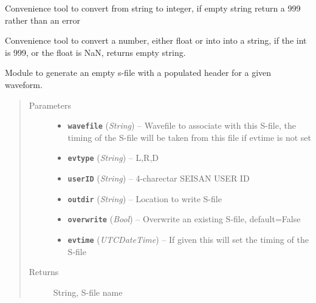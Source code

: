\documentclass[a4paper,10pt,english]{sphinxmanual}
\begin{document}
\begin{fulllineitems}
\label{submodules/utils.Sfile_util:Sfile_util._int_conv}
Convenience tool to convert from string to integer, if empty string return
a 999 rather than an error

\end{fulllineitems}


\begin{fulllineitems}
\label{submodules/utils.Sfile_util:Sfile_util._str_conv}
Convenience tool to convert a number, either float or into into a string,
if the int is 999, or the float is NaN, returns empty string.

\end{fulllineitems}


\begin{fulllineitems}
\label{submodules/utils.Sfile_util:Sfile_util.blanksfile}
Module to generate an empty s-file with a populated header for a given
waveform.
\begin{quote}\begin{description}
\item[{Parameters}] \leavevmode\begin{itemize}
\item {} 
\textbf{\texttt{wavefile}} (\emph{String}) -- Wavefile to associate with this S-file, the timing of the
S-file will be taken from this file if evtime is not set

\item {} 
\textbf{\texttt{evtype}} (\emph{String}) -- L,R,D

\item {} 
\textbf{\texttt{userID}} (\emph{String}) -- 4-charectar SEISAN USER ID

\item {} 
\textbf{\texttt{outdir}} (\emph{String}) -- Location to write S-file

\item {} 
\textbf{\texttt{overwrite}} (\emph{Bool}) -- Overwrite an existing S-file, default=False

\item {} 
\textbf{\texttt{evtime}} (\emph{UTCDateTime}) -- If given this will set the timing of the S-file

\end{itemize}

\item[{Returns}] \leavevmode
String, S-file name

\end{description}\end{quote}

\end{fulllineitems}
\end{document}
